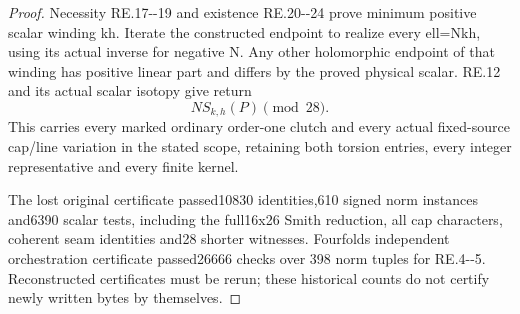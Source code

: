 \begin{proof}
Necessity RE.17-\/-19 and existence RE.20-\/-24 prove minimum positive
scalar winding kh. Iterate the constructed endpoint to realize every
ell=Nkh, using its actual inverse for negative N. Any other holomorphic
endpoint of that winding has positive linear part and differs by the
proved physical scalar. RE.12 and its actual scalar isotopy give return
\[
                              N S_{k,h}(P)\pmod{28}.\tag{RE.28}
\]
This carries every marked ordinary order-one clutch and every actual
fixed-source cap/line variation in the stated scope, retaining both
torsion entries, every integer representative and every finite kernel.

The lost original certificate passed10830 identities,610 signed norm
instances and6390 scalar tests, including the full16x26 Smith reduction,
all cap characters, coherent seam identities and28 shorter witnesses.
Fourfold\textquotesingle s independent orchestration certificate passed26666 checks over
398 norm tuples for RE.4-\/-5. Reconstructed certificates must be rerun;
these historical counts do not certify newly written bytes by themselves.

\end{proof}
